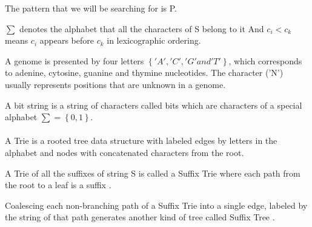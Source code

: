 \documentclass[11pt,a4paper]{report}
\begin{document}
The pattern that we will be searching for is P.


$ \sum $  denotes the alphabet that all the characters of S belong to it And  
$ c_{i} < c_{k}$ means $c_{i}$ appears before $c_{k}$ in lexicographic ordering.

A genome is presented by four letters $\left\{ 'A', 'C', 'G' and 'T'\right\}$, 
which corresponds to adenine, cytosine, guanine and thymine nucleotides. 
The character ('N') usually represents positions that are unknown in a genome.


A bit string is a string of characters called bits which are characters of a 
special alphabet  $ \sum = \left\{ 0, 1 \right\}$.
\\\\


A Trie is a rooted tree data structure with labeled edges by letters in the 
alphabet and nodes with concatenated characters from the root\cite{trie}. 

A Trie of all the suffixes of string S is called a Suffix Trie where each path
 from the root to a leaf is a suffix \cite{gusfield1997algorithms}.

Coalescing each non-branching path of a Suffix Trie into a single edge, labeled 
by the string of that path generates another kind of tree called Suffix Tree 
\cite{gusfield1997algorithms}.\\
\end{document}
